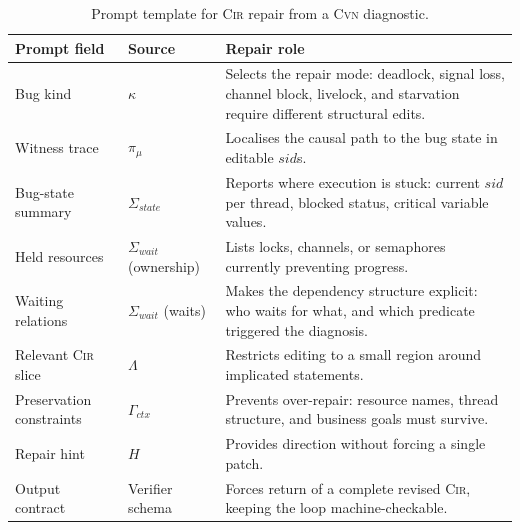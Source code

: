 \documentclass[sigconf]{acmart}
\begin{document}
\begin{table}[t]
\caption{Prompt template for \textsc{Cir} repair from a
  \textsc{Cvn} diagnostic.}
\label{tab:repair-templates}
\centering\small
\begin{tabular}{@{}p{3.0cm}p{4.2cm}p{7.7cm}@{}}
\toprule
\textbf{Prompt field}
  & \textbf{Source}
  & \textbf{Repair role} \\
\midrule
Bug kind
  & $\kappa$
  & Selects the repair mode: deadlock, signal loss,
    channel block, livelock, and starvation require
    different structural edits. \\
\addlinespace[3pt]
Witness trace
  & $\pi_{\mu}$
  & Localises the causal path to the bug state in editable $\mathit{sid}$s. \\
\addlinespace[3pt]
Bug-state summary
  & $\Sigma_{\mathit{state}}$
  & Reports where execution is stuck: current $\mathit{sid}$ per thread, blocked status, critical variable values. \\
\addlinespace[3pt]
Held resources
  & $\Sigma_{\mathit{wait}}$ (ownership)
  & Lists locks, channels, or semaphores currently preventing progress. \\
\addlinespace[3pt]
Waiting relations
  & $\Sigma_{\mathit{wait}}$ (waits)
  & Makes the dependency structure explicit: who waits for what, and which predicate triggered the diagnosis. \\
\addlinespace[3pt]
Relevant \textsc{Cir} slice
  & $\Lambda$
  & Restricts editing to a small region around implicated statements. \\
\addlinespace[3pt]
Preservation constraints
  & $\Gamma_{\mathit{ctx}}$
  & Prevents over-repair: resource names, thread structure, and business goals must survive. \\
\addlinespace[3pt]
Repair hint
  & $H$
  & Provides direction without forcing a single patch. \\
\addlinespace[3pt]
Output contract
  & Verifier schema
  & Forces return of a complete revised \textsc{Cir}, keeping the loop machine-checkable. \\
\bottomrule
\end{tabular}
\end{table}
\end{document}

